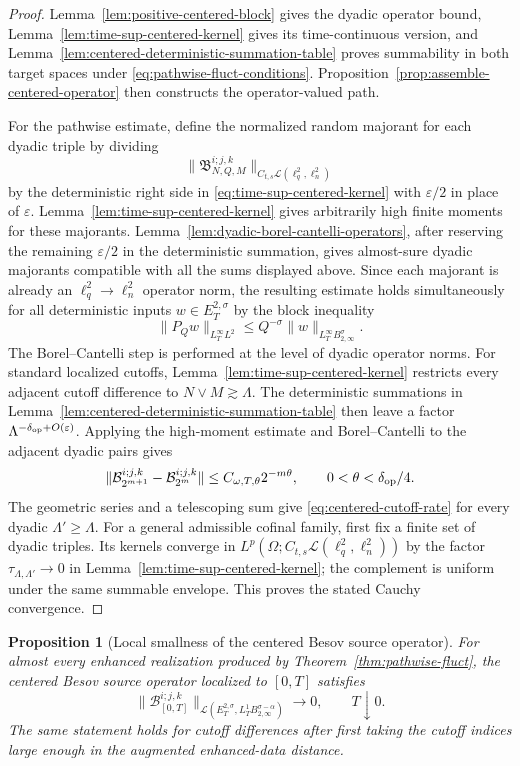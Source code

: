 \documentclass[10pt]{amsart}
\numberwithin{equation}{section}
\theoremstyle{plain}
\newtheorem{proposition}[theorem]{Proposition}
\theoremstyle{definition}
\theoremstyle{remark}
\newcommand{\Btwo}{B_{2,\infty}}
\newcommand{\eps}{\varepsilon}
\begin{document}
\begin{proof}
Lemma~\ref{lem:positive-centered-block} gives the dyadic operator bound, Lemma~\ref{lem:time-sup-centered-kernel} gives its time-continuous version, and Lemma~\ref{lem:centered-deterministic-summation-table} proves summability in both target spaces under \eqref{eq:pathwise-fluct-conditions}.  Proposition~\ref{prop:assemble-centered-operator} then constructs the operator-valued path.

For the pathwise estimate, define the normalized random majorant for each dyadic triple by dividing
\[
\|\mathfrak B_{N,Q,M}^{i;j,k}\|_{C_{t,s}\mathcal L(\ell^2_q,\ell^2_n)}
\]
by the deterministic right side in \eqref{eq:time-sup-centered-kernel} with $\eps/2$ in place of $\eps$.  Lemma~\ref{lem:time-sup-centered-kernel} gives arbitrarily high finite moments for these majorants.  Lemma~\ref{lem:dyadic-borel-cantelli-operators}, after reserving the remaining $\eps/2$ in the deterministic summation, gives almost-sure dyadic majorants compatible with all the sums displayed above.  Since each majorant is already an $\ell^2_q\to\ell^2_n$ operator norm, the resulting estimate holds simultaneously for all deterministic inputs $w\in E_T^{2,\sigma}$ by the block inequality
\[
        \|P_Qw\|_{L_T^\infty L^2}\le Q^{-\sigma}\|w\|_{L_T^\infty\Btwo^\sigma}.
\]
The Borel--Cantelli step is performed at the level of dyadic operator norms.  For standard localized cutoffs, Lemma~\ref{lem:time-sup-centered-kernel} restricts every adjacent cutoff difference to $N\vee M\gtrsim\Lambda$.  The deterministic summations in Lemma~\ref{lem:centered-deterministic-summation-table} then leave a factor $\Lambda^{-\delta_{\rm op}+O(\eps)}$.  Applying the high-moment estimate and Borel--Cantelli to the adjacent dyadic pairs gives
\[
 \|\mathcal B_{2^{m+1}}^{i;j,k}-\mathcal B_{2^m}^{i;j,k}\|
 \le C_{\omega,T,\theta}2^{-m\theta},
 \qquad 0<\theta<\delta_{\rm op}/4.
\]
The geometric series and a telescoping sum give \eqref{eq:centered-cutoff-rate} for every dyadic $\Lambda'\ge\Lambda$.  For a general admissible cofinal family, first fix a finite set of dyadic triples.  Its kernels converge in $L^p(\Omega;C_{t,s}\mathcal L(\ell_q^2,\ell_n^2))$ by the factor $\tau_{\Lambda,\Lambda'}\to0$ in Lemma~\ref{lem:time-sup-centered-kernel}; the complement is uniform under the same summable envelope.  This proves the stated Cauchy convergence.
\end{proof}


\begin{proposition}[Local smallness of the centered Besov source operator]\label{prop:centered-besov-local-smallness}
For almost every enhanced realization produced by Theorem~\ref{thm:pathwise-fluct}, the centered Besov source operator localized to $[0,T]$ satisfies
\begin{equation}\label{eq:centered-besov-local-smallness}
        \|\mathcal B^{i;j,k}_{[0,T]}\|_{\mathcal L(E_T^{2,\sigma},L_T^1\Btwo^{\sigma-\alpha})}
        \longrightarrow 0,
        \qquad T\downarrow0.
\end{equation}
The same statement holds for cutoff differences after first taking the cutoff indices large enough in the augmented enhanced-data distance.
\end{proposition}
\end{document}
